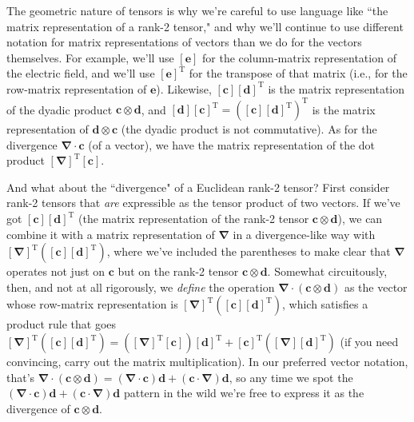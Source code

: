 \documentclass[12pt]{article}
\renewcommand{\vv}[1]{\mathbf{#1}}
\newcommand{\del}{\boldsymbol{\nabla}}
\begin{document}
The geometric nature of tensors is why we're careful to use language like ``the matrix representation of a rank-2 tensor," and why we'll continue to use different notation for matrix representations of vectors than we do for the vectors themselves. For example, we'll use $[\vv e]$ for the column-matrix representation of the electric field, and we'll use $[\vv e]^{\textrm{T}}$ for the transpose of that matrix (i.e., for the row-matrix representation of $\vv e$). Likewise, $[\vv c][\vv d]^{\textrm{T}}$ is the matrix representation of the dyadic product $\vv c \otimes \vv d$, and $[\vv d][\vv c]^{\textrm{T}} = ([\vv c][\vv d]^{\textrm{T}})^{\textrm{T}}$ is the matrix representation of $\vv d \otimes \vv c$ (the dyadic product is not commutative). As for the divergence $\del \cdot \vv c$ (of a vector), we have the matrix representation of the dot product $[\del]^{\textrm{T}}[\vv c]$.

And what about the ``divergence" of a Euclidean rank-2 tensor? First consider rank-2 tensors that \emph{are} expressible as the tensor product of two vectors. If we've got $[\vv c][\vv d]^{\textrm{T}}$ (the matrix representation of the rank-2 tensor $\vv c \otimes \vv d$), we can combine it with a matrix representation of $\del$ in a divergence-like way with $[\del]^{\textrm{T}}([\vv c][\vv d]^{\textrm{T}})$, where we've included the parentheses to make clear that $\del$ operates not just on $\vv c$ but on the rank-2 tensor $\vv c \otimes \vv d$. Somewhat circuitously, then, and not at all rigorously, we \emph{define} the operation $\del \cdot (\vv c \otimes \vv d)$ as the vector whose row-matrix representation is $[\del]^{\textrm{T}}([\vv c][\vv d]^{\textrm{T}})$, which satisfies a product rule that goes $[\del]^{\textrm{T}}([\vv c][\vv d]^{\textrm{T}}) = ([\del]^{\textrm{T}}[\vv c])[\vv d]^{\textrm{T}} + [\vv c]^{\textrm{T}}([\del][\vv d]^{\textrm{T}})$ (if you need convincing, carry out the matrix multiplication). In our preferred vector notation, that's $\del \cdot (\vv c \otimes \vv d) = (\del \cdot \vv c) \vv d + (\vv c \cdot \del) \vv d$, so any time we spot the $(\del \cdot \vv c) \vv d + (\vv c \cdot \del) \vv d$ pattern in the wild we're free to express it as the divergence of $\vv c \otimes \vv d$.
\end{document}
